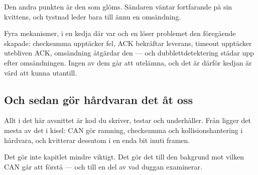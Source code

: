 Den andra punkten är den som glöms. Sändaren väntar fortfarande på sin kvittens, och tystnad
leder bara till ännu en omsändning.

\begin{aside}
\note Fyra mekanismer, i en kedja där var och en löser problemet den föregående skapade:
checksumma upptäcker fel, ACK bekräftar leverans, timeout upptäcker utebliven ACK, omsändning
åtgärdar den --- och dubblettdetektering städar upp efter omsändningen. Ingen av dem går att
utelämna, och det är därför kedjan är värd att kunna utantill.
\end{aside}

\subsection{Och sedan gör hårdvaran det åt oss}

Allt i det här avsnittet är kod du skriver, testar och underhåller. Från  ligger
det mesta av det i kisel: CAN gör ramning, checksumma och kollisionshantering i hårdvara, och
kvitterar dessutom i en enda bit inuti framen.

Det gör inte kapitlet mindre viktigt. Det gör det till den bakgrund mot vilken CAN går att
förstå --- och till en del av vad duggan examinerar.
